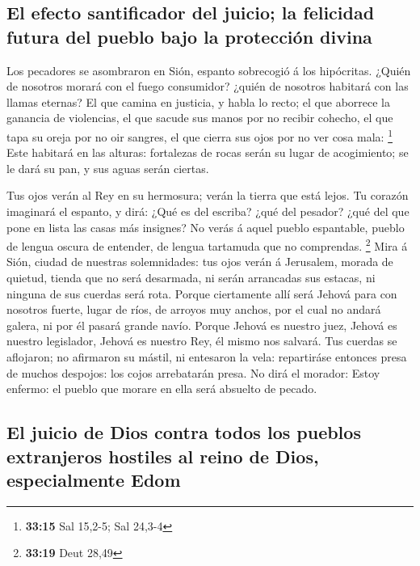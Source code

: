 \hypertarget{el-efecto-santificador-del-juicio-la-felicidad-futura-del-pueblo-bajo-la-protecciuxf3n-divina}{%
\subsection{El efecto santificador del juicio; la felicidad futura del
pueblo bajo la protección
divina}\label{el-efecto-santificador-del-juicio-la-felicidad-futura-del-pueblo-bajo-la-protecciuxf3n-divina}}

 Los pecadores se asombraron en Sión, espanto sobrecogió
á los hipócritas. ¿Quién de nosotros morará con el fuego consumidor?
¿quién de nosotros habitará con las llamas eternas?  El
que camina en justicia, y habla lo recto; el que aborrece la ganancia de
violencias, el que sacude sus manos por no recibir cohecho, el que tapa
su oreja por no oir sangres, el que cierra sus ojos por no ver cosa
mala: \footnote{\textbf{33:15} Sal 15,2-5; Sal 24,3-4} 
Este habitará en las alturas: fortalezas de rocas serán su lugar de
acogimiento; se le dará su pan, y sus aguas serán ciertas.

 Tus ojos verán al Rey en su hermosura; verán la tierra
que está lejos.  Tu corazón imaginará el espanto, y dirá:
¿Qué es del escriba? ¿qué del pesador? ¿qué del que pone en lista las
casas más insignes?  No verás á aquel pueblo espantable,
pueblo de lengua oscura de entender, de lengua tartamuda que no
comprendas. \footnote{\textbf{33:19} Deut 28,49}  Mira á
Sión, ciudad de nuestras solemnidades: tus ojos verán á Jerusalem,
morada de quietud, tienda que no será desarmada, ni serán arrancadas sus
estacas, ni ninguna de sus cuerdas será rota.  Porque
ciertamente allí será Jehová para con nosotros fuerte, lugar de ríos, de
arroyos muy anchos, por el cual no andará galera, ni por él pasará
grande navío.  Porque Jehová es nuestro juez, Jehová es
nuestro legislador, Jehová es nuestro Rey, él mismo nos salvará.
 Tus cuerdas se aflojaron; no afirmaron su mástil, ni
entesaron la vela: repartiráse entonces presa de muchos despojos: los
cojos arrebatarán presa.  No dirá el morador: Estoy
enfermo: el pueblo que morare en ella será absuelto de pecado.

\hypertarget{el-juicio-de-dios-contra-todos-los-pueblos-extranjeros-hostiles-al-reino-de-dios-especialmente-edom}{%
\subsection{El juicio de Dios contra todos los pueblos extranjeros
hostiles al reino de Dios, especialmente
Edom}\label{el-juicio-de-dios-contra-todos-los-pueblos-extranjeros-hostiles-al-reino-de-dios-especialmente-edom}}

